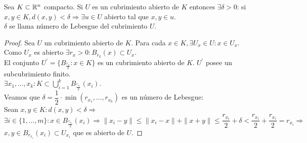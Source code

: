 \begin{prop}
  Sea \(K \subset \mathbb{R}^n\) compacto. Si \(U\) es un cubrimiento abierto de \(K\) entonces \(\exists \delta > 0 \): si \(x, y \in K, d(x, y) < \delta \Rightarrow \exists u \in U\) abierto tal que \(x, y \in u\). \\
  \(\delta \) se llama número de Lebesgue del cubrimiento \(U\).
  \begin{proof}
    Sea \(U\) un cubrimiento abierto de \(K\). Para cada \(x \in K, \exists U_x \in U : x \in U_x\). Como \(U_x\) es abierto \(\exists r_x > 0 : B_{r_k}(x) \subset U_x\). \\
    El conjunto \(U^{\prime} = \{ B_{\frac{r_x}{2}} : x \in K \} \) es un cubrimiento abierto de \(K\). \(U^{\prime} \) posee un subcubrimiento finito. \\
    \(\exists x_1, \ldots, x_k : K \subset \bigcup_{i = 1}^{k} B_{\frac{r_{x_i}}{2}}(x_i)\). \\
    Veamos que \(\delta = \dfrac{1}{2} \cdot \min(r_{x_1}, \ldots, r_{x_k})\) es un número de Lebesgue: \\
    Sean \(x, y \in K : d(x,y) < \delta \Rightarrow \) \\
    \(\exists i \in \{1, \ldots, m\} : x \in B_{\frac{r_{x_i}}{2}}(x_i) \Rightarrow \|x_i - y\| \leq \|x_i - x\| + \|x+y\| \leq \dfrac{r_{x_i}}{2} + \delta < \dfrac{r_{x_i}}{2} + \dfrac{r_{x_i}}{2} = r_{x_i} \Rightarrow \) \\
    \(x, y \in B_{r_{x_i}}(x_i) \subset U_{x_i} \) que es abierto de \(U\).
  \end{proof}
\end{prop}